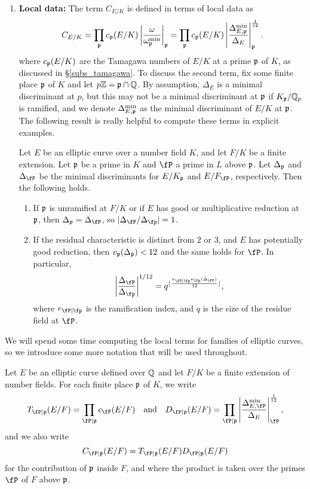 \begin{enumerate}
    \item \textbf{Local data:} The term $C_{E/K}$ is defined in terms of local data as 
    $$C_{E/K}=\prod_{\mathfrak{p}}c_{\mathfrak{p}}(E/K)\left|\frac{\omega}{\omega_{\mathfrak{p}}^{\min}}\right|_{\mathfrak{p}}=\prod_{\mathfrak{p}}c_{\mathfrak{p}}(E/K)\left|\frac{\Delta_{E,\mathfrak{p}}^{\min}}{\Delta_E}\right|_{\mathfrak{p}}^{\frac{1}{12}}.$$
    where $c_{\mathfrak{p}}(E/K)$ are the Tamagawa numbers of $E/K$ at a prime $\mathfrak{p}$ of $K$, as discussed in \S\ref*{subs_tamagawa}. To discuss the second term, fix some finite place $\mathfrak{p}$ of $K$ and let $p\mathbb{Z}=\mathfrak{p}\cap\mathbb{Q}$. By assumption, $\Delta_E$ is a minimal discriminant at $p$, but this may not be a minimal discriminant at $\mathfrak{p}$ if $K_{\mathfrak{p}}/\mathbb{Q}_p$ is ramified, and we denote $\Delta_{E,\mathfrak{p}}^{\min}$ as the minimal discriminant of $E/K$ at $\mathfrak{p}$. The following result is really helpful to compute these terms in explicit examples.
    
    \begin{lemma}\label{lem_Dterms}
        Let $E$ be an elliptic curve over a number field $K$, and let $F/K$ be a finite extension. Let $\mathfrak{p}$ be a prime in $K$ and $\fP$ a prime in $L$ above $\mathfrak{p}$. Let $\Delta_{\mathfrak{p}}$ and $\Delta_\fP$ be the minimal discriminants for $E/K_{\mathfrak{p}}$ and $E/F_\fP$, respectively. Then the following holds.
        \begin{enumerate}
            \item If $\mathfrak{p}$ is unramified at $F/K$ or if $E$ has good or multiplicative reduction at $\mathfrak{p}$, then $\Delta_\pp=\Delta_\fP$, so $|\Delta_\fP/\Delta_\fp|=1$.
            \item If the residual characteristic is distinct from $2$ or $3$, and $E$ has potentially good reduction, then $v_{\mathfrak{p}}(\Delta_{\mathfrak{p}})<12$ and the same holds for $\fP$. In particular, 
            $$\left|\frac{\Delta_\fP}{\Delta_\fp}\right|^{1/12}=q^{\floor{\frac{e_{\fP\mid\fp}\nu_\fp(\Delta_\fP)}{12}}},$$
            where $e_{\fP\mid\fp}$ is the ramification index, and $q$ is the size of the residue field at $\fP$.
        \end{enumerate}
    \end{lemma}

\end{enumerate}

We will spend some time computing the local terms for families of elliptic curves, so we introduce some more notation that will be used throughout. 

\begin{notation}\label{not_contr}
    Let $E$ be an elliptic curve defined over $\mathbb{Q}$ and let $F/K$ be a finite extension of number fields. For each finite place $\mathfrak{p}$ of $K$, we write 
    $$T_{\fP\mid\pp}(E/F)=\prod_{\fP\mid\pp}c_\fP(E/F)\quad\text{and}\quad D_{\fP\mid\pp}(E/F)=\prod_{\fP\mid\pp}\left|\frac{\Delta_{E,\fP}^{\min}}{\Delta_E}\right|_\fP^{\frac{1}{12}},$$
    and we also write 
    $$C_{\fP\mid \pp}(E/F)=T_{\fP\mid \pp}(E/F)D_{\fP\mid \pp}(E/F)$$
    for the contribution of $\mathfrak{p}$ inside $F$, and
    where the product is taken over the primes $\fP$ of $F$ above $\mathfrak{p}$. 
\end{notation}

